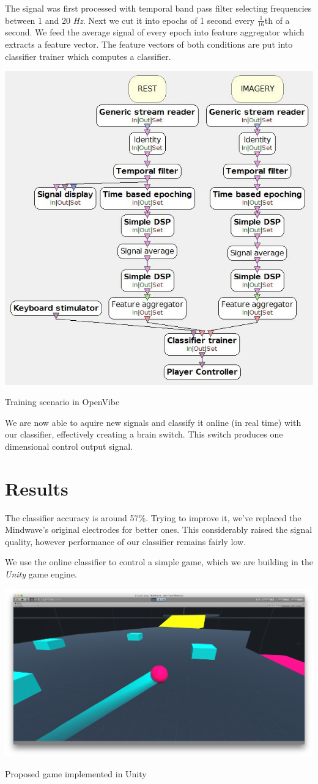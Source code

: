 \documentclass[a1,portrait]{sciposter}
\def\mysection#1{
{\color{sectionCol}\section*{\sc\bfseries #1}}}
\begin{document}
\begin{multicols*}{3}
The signal was first processed with temporal band pass filter selecting frequencies between 1 and 20 \emph{Hz}. Next we cut it into epochs of 1 second every \( \frac{1}{16} \)th of a second. We feed the average signal of every epoch into feature aggregator which extracts a feature vector. The feature vectors of both conditions are put into classifier trainer which computes a classifier.

\includegraphics[width=\columnwidth]{training}
\caption{Training scenario in OpenVibe}

We are now able to aquire new signals and classify it online (in real time) with our classifier, effectively creating a brain switch. This switch produces one dimensional control output signal.

\mysection{Results}

The classifier accuracy is around 57\%. Trying to improve it, we've replaced the Mindwave's original electrodes for better ones. This considerably raised the signal quality, however performance of our classifier remains fairly low.

We use the online classifier to control a simple game, which we are building in the \emph{Unity} game engine.

\includegraphics[width=\columnwidth]{game}
\caption{Proposed game implemented in Unity} 


\end{multicols*}
\end{document}
